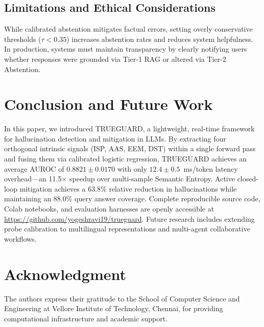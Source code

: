 \documentclass[journal]{IEEEtran}
\begin{document}
\subsection{Limitations and Ethical Considerations}
While calibrated abstention mitigates factual errors, setting overly conservative thresholds ($\tau < 0.35$) increases abstention rates and reduces system helpfulness. In production, systems must maintain transparency by clearly notifying users whether responses were grounded via Tier-1 RAG or altered via Tier-2 Abstention.

\section{Conclusion and Future Work}
In this paper, we introduced TRUEGUARD, a lightweight, real-time framework for hallucination detection and mitigation in LLMs. By extracting four orthogonal intrinsic signals (ISP, AAS, EEM, DST) within a single forward pass and fusing them via calibrated logistic regression, TRUEGUARD achieves an average AUROC of $0.8821 \pm 0.0170$ with only $12.4 \pm 0.5$~ms/token latency overhead---an 11.5$\times$ speedup over multi-sample Semantic Entropy. Active closed-loop mitigation achieves a 63.8\% relative reduction in hallucinations while maintaining an 88.0\% query answer coverage. Complete reproducible source code, Colab notebooks, and evaluation harnesses are openly accessible at \url{https://github.com/yogeshravi19/trueguard}. Future research includes extending probe calibration to multilingual representations and multi-agent collaborative workflows.

\section*{Acknowledgment}
The authors express their gratitude to the School of Computer Science and Engineering at Vellore Institute of Technology, Chennai, for providing computational infrastructure and academic support.
\end{document}
